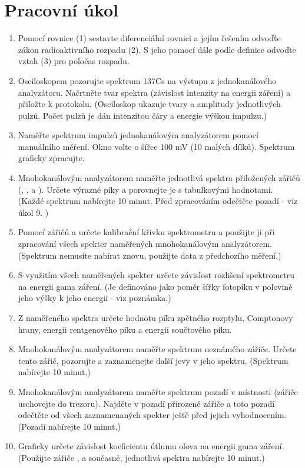 \section{Pracovní úkol}
\begin{enumerate}
\item Pomocí rovnice (1)\cite{C_1} sestavte diferenciální rovnici a jejím řešením odvoďťe
zákon radioaktivního rozpadu (2)\cite{C_1}. S jeho pomocí dále podle definice odvoďte vztah
(3) pro poločas rozpadu.
\item Osciloskopem pozorujte spektrum 137Cs na výstupu z jednokanálového analyzátoru. Načrtněte
tvar spektra (závislost intenzity na energii záření) a přiložte k protokolu. (Osciloskop ukazuje
tvary a amplitudy jednotlivých pulzů. Počet pulzů je dán intenzitou čáry a energie výškou impulzu.)
\item Naměřte spektrum impulzů  jednokanálovým analyzátorem pomocí manuálního měření.
Okno volte o šířce 100 mV (10 malých dílků). Spektrum graficky zpracujte.
\item Mnohokanálovým analyzátorem naměřte jednotlivá spektra přiložených zářičů (, ,
 a ). Určete výrazné píky a porovnejte je s tabulkovými hodnotami. (Každé spektrum
nabírejte 10 minut. Před zpracováním odečtěte pozadí - viz úkol 9. \cite{C_1})
\item Pomocí zářičů  a  určete kalibrační křivku spektrometru a použijte ji při zpracování
všech spekter naměřených mnohokanálovým analyzátorem. (Spektrum nemusíte nabírat znovu,
použijte data z předchozího měření.)
\item S využitím všech naměřených spekter určete závislost rozlišení spektrometru na energii gama
záření. (Je definováno jako poměr šířky fotopíku v polovině jeho výšky k jeho energii - viz
poznámka.)
\item Z naměřeného spektra  určete hodnotu píku zpětného rozptylu, Comptonovy hrany,
energii rentgenového píku a energii součtového píku.
\item Mnohokanálovým analyzátorem naměřte spektrum neznámého zářiče. Určete tento zářič, pozorujte
a zaznamenejte další jevy v jeho spektru. (Spektrum nabírejte 10 minut.)
\item Mnohokanálovým analyzátorem naměřte spektrum pozadí v místnosti (zářiče uschovejte do
trezoru). Najděte v pozadí přirozené zářiče a toto pozadí odečtěte od všech zaznamenaných
spekter ještě před jejich vyhodnocením. (Pozadí nabírejte 10 minut.)
\item Graficky určete závislost koeficientu útlumu olova na energii gama záření. (Použijte zářiče
,  a  současně, jednotlivá spektra nabírejte 10 minut.)
\end{enumerate}

